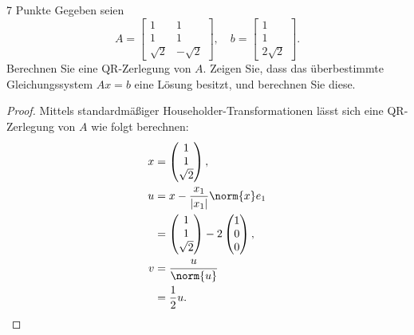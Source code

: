 \documentclass{problemset}
\author{Michael van Straten}
\begin{document}
\maketitle

\setcounter{problem}{2}

\begin{problem}{7 Punkte}
Gegeben seien
\begin{equation}
    A =
    \begin{bmatrix}
        1        & 1         \\
        1        & 1         \\
        \sqrt{2} & -\sqrt{2}
    \end{bmatrix}, \quad
    b =
    \begin{bmatrix}
        1 \\
        1 \\
        2\sqrt{2}
    \end{bmatrix}.
\end{equation}
Berechnen Sie eine QR-Zerlegung von \( A \). Zeigen Sie, dass das überbestimmte
Gleichungssystem \( Ax = b \) eine Lösung besitzt, und berechnen Sie diese.

\begin{proof}
    Mittels standardmäßiger Householder-Transformationen lässt sich eine
    QR-Zerlegung von \( A \) wie folgt berechnen:
    \begin{align*}
        x & = \begin{pmatrix}
                  1 \\ 1 \\ \sqrt{2}
              \end{pmatrix},                  \\
        u & = x - \frac{x_1}{|x_1|} \norm{x} e_1 \\
          & = \begin{pmatrix}
                  1 \\ 1 \\ \sqrt{2}
              \end{pmatrix} - 2 \begin{pmatrix}
                                    1 \\ 0 \\ 0
                                \end{pmatrix},   \\
        v & = \frac{u}{\norm{u}}                 \\
          & = \frac{1}{2} u.
    \end{align*}


\end{proof}
\end{problem}
\end{document}
